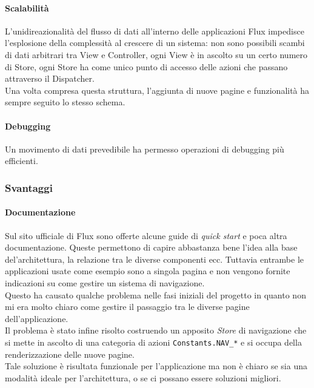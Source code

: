 \paragraph{Scalabilità}
L'unidireazionalità del flusso di dati all'interno delle applicazioni Flux impedisce
l'esplosione della complessità al crescere di un sistema: non sono possibili scambi di
dati arbitrari tra View e Controller, ogni View è in ascolto su un certo numero di Store,
ogni Store ha come unico punto di accesso delle azioni che passano attraverso il Dispatcher. \\

Una volta compresa questa struttura, l'aggiunta di nuove pagine e funzionalità
ha sempre seguito lo stesso schema.

\paragraph{Debugging}
Un movimento di dati prevedibile ha permesso operazioni di debugging più efficienti.

\subsubsection{Svantaggi}

\paragraph{Documentazione}
Sul sito ufficiale di Flux sono offerte alcune guide di \textit{quick start} e poca
altra documentazione. Queste permettono di capire abbastanza bene l'idea alla base
del'architettura, la relazione tra le diverse componenti ecc. Tuttavia entrambe le
applicazioni usate come esempio sono a singola pagina e non vengono fornite indicazioni
su come gestire un sistema di navigazione. \\
Questo ha causato qualche problema nelle fasi iniziali del progetto in quanto non
mi era molto chiaro come gestire il passaggio tra le diverse pagine dell'applicazione. \\
Il problema è stato infine risolto costruendo un apposito \textit{Store} di navigazione
che si mette in ascolto di una categoria di azioni \texttt{Constants.NAV\_*} e si occupa
della renderizzazione delle nuove pagine. \\
Tale soluzione è risultata funzionale per l'applicazione ma non è chiaro se sia una modalità
ideale per l'architettura, o se ci possano essere soluzioni migliori.

